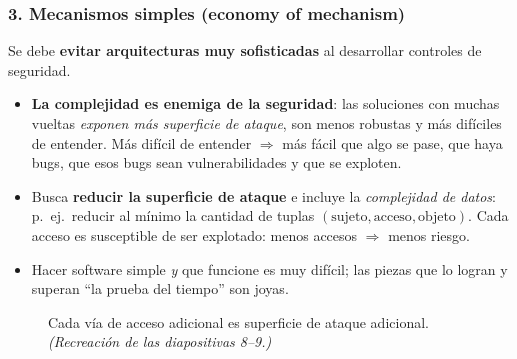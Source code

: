 \documentclass[11pt,a4paper]{article}
\begin{document}
\subsubsection{3. Mecanismos simples (economy of mechanism)}
Se debe \textbf{evitar arquitecturas muy sofisticadas} al desarrollar controles de seguridad.
\begin{itemize}[leftmargin=1.4em,itemsep=1pt]
  \item \textbf{La complejidad es enemiga de la seguridad}: las soluciones con muchas vueltas
        \emph{exponen más superficie de ataque}, son menos robustas y más difíciles de
        entender. Más difícil de entender $\Rightarrow$ más fácil que algo se pase, que haya
        bugs, que esos bugs sean vulnerabilidades y que se exploten.
  \item Busca \textbf{reducir la superficie de ataque} e incluye la \emph{complejidad de
        datos}: p.\ ej.\ reducir al mínimo la cantidad de tuplas $(\text{sujeto},
        \text{acceso}, \text{objeto})$. Cada acceso es susceptible de ser explotado: menos
        accesos $\Rightarrow$ menos riesgo.
  \item Hacer software simple \emph{y} que funcione es muy difícil; las piezas que lo logran
        y superan ``la prueba del tiempo'' son joyas.
\end{itemize}

\begin{figure}[h]
\centering
{}
\caption{Cada vía de acceso adicional es superficie de ataque adicional.
\textit{(Recreación de las diapositivas 8--9.)}}
\end{figure}
\end{document}
